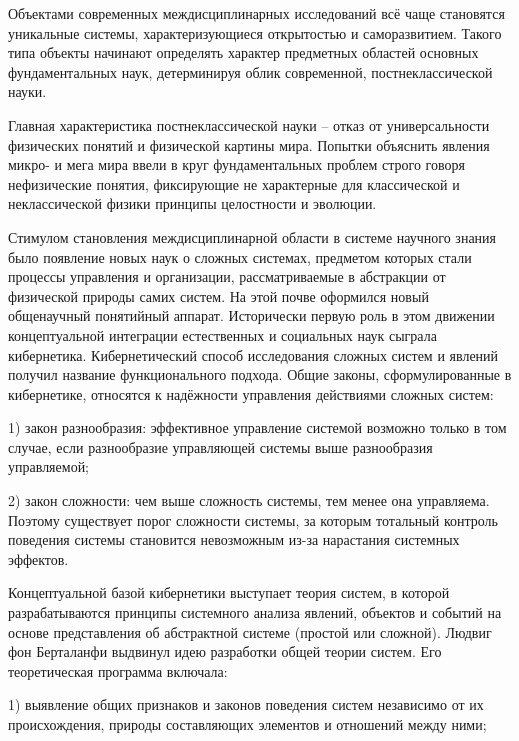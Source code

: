 \documentclass[exam_answers.tex]{subfiles}
\begin{document}
\renewcommand{\baselinestretch}{\blch}

Объектами современных междисциплинарных исследований всё чаще становятся уникальные системы, характеризующиеся открытостью и саморазвитием.
Такого типа объекты начинают определять характер предметных областей основных фундаментальных наук, детерминируя облик современной, постнеклассической науки.

Главная характеристика постнеклассической науки – отказ от универсальности физических понятий и физической картины мира.
Попытки объяснить явления микро- и мега мира ввели в круг фундаментальных проблем строго говоря нефизические понятия, фиксирующие не характерные для классической и неклассической физики принципы целостности и эволюции.

Стимулом становления междисциплинарной области в системе научного знания было появление новых наук о сложных системах, предметом которых стали процессы управления и организации, рассматриваемые в абстракции от физической природы самих систем.
На этой почве оформился новый общенаучный понятийный аппарат.
Исторически первую роль в этом движении концептуальной интеграции естественных и социальных наук сыграла кибернетика.
Кибернетический способ исследования сложных систем и явлений получил название функционального подхода.
Общие законы, сформулированные в кибернетике, относятся к надёжности управления действиями сложных систем:

1) закон разнообразия: эффективное управление системой возможно только в том случае, если разнообразие управляющей системы выше разнообразия управляемой;

2) закон сложности: чем выше сложность системы, тем менее она управляема.
Поэтому существует порог сложности системы, за которым тотальный контроль поведения системы становится невозможным из-за нарастания системных эффектов.

Концептуальной базой кибернетики выступает теория систем, в которой разрабатываются принципы системного анализа явлений, объектов и событий на основе представления об абстрактной системе (простой или сложной).
Людвиг фон Берталанфи выдвинул идею разработки общей теории систем.
Его теоретическая программа включала:

1) выявление общих признаков и законов поведения систем независимо от их происхождения, природы составляющих элементов и отношений между ними;
\end{document}
